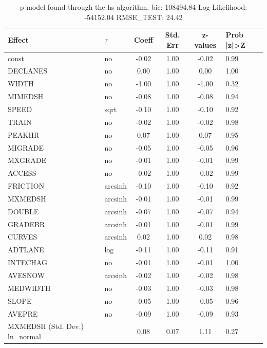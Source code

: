 \begin{table}
	\caption{p model found through the hs algorithm. bic: 108494.84 Log-Likelihood: -54152.04 RMSE_TEST: 24.42}
	\begin{center}
		\begin{tabular}{|l|l|c|c|c|l|}
			\hline
			Effect & $\tau$ & Coeff & Std. Err & z-values & Prob |z|>Z \\
			\hline
			const & no & -0.02 & 1.00 & -0.02 & 0.99 \\
			\hline
			DECLANES & no & 0.00 & 1.00 & 0.00 & 1.00 \\
			\hline
			WIDTH & no & -1.00 & 1.00 & -1.00 & 0.32 \\
			\hline
			MIMEDSH & no & -0.08 & 1.00 & -0.08 & 0.94 \\
			\hline
			SPEED & sqrt & -0.10 & 1.00 & -0.10 & 0.92 \\
			\hline
			TRAIN & no & -0.02 & 1.00 & -0.02 & 0.98 \\
			\hline
			PEAKHR & no & 0.07 & 1.00 & 0.07 & 0.95 \\
			\hline
			MIGRADE & no & -0.05 & 1.00 & -0.05 & 0.96 \\
			\hline
			MXGRADE & no & -0.01 & 1.00 & -0.01 & 0.99 \\
			\hline
			ACCESS & no & -0.02 & 1.00 & -0.02 & 0.99 \\
			\hline
			FRICTION & arcsinh & -0.10 & 1.00 & -0.10 & 0.92 \\
			\hline
			MXMEDSH & arcsinh & -0.01 & 1.00 & -0.01 & 0.99 \\
			\hline
			DOUBLE & arcsinh & -0.07 & 1.00 & -0.07 & 0.94 \\
			\hline
			GRADEBR & arcsinh & -0.01 & 1.00 & -0.01 & 0.99 \\
			\hline
			CURVES & arcsinh & 0.02 & 1.00 & 0.02 & 0.98 \\
			\hline
			ADTLANE & log & -0.11 & 1.00 & -0.11 & 0.91 \\
			\hline
			INTECHAG & no & -0.01 & 1.00 & -0.01 & 1.00 \\
			\hline
			AVESNOW & arcsinh & -0.02 & 1.00 & -0.02 & 0.98 \\
			\hline
			MEDWIDTH & no & -0.03 & 1.00 & -0.03 & 0.98 \\
			\hline
			SLOPE & no & -0.05 & 1.00 & -0.05 & 0.96 \\
			\hline
			AVEPRE & no & -0.09 & 1.00 & -0.09 & 0.93 \\
			\hline
			MXMEDSH (Std. Dev.) ln_normal &  & 0.08 & 0.07 & 1.11 & 0.27 \\

\end{tabular}
\end{center}
\end{table}
